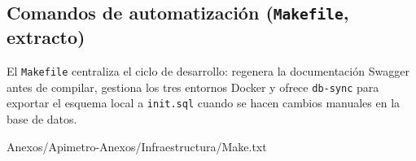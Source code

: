 \subsection*{Comandos de automatización (\texttt{Makefile}, extracto)}

El \texttt{Makefile} centraliza el ciclo de desarrollo: regenera la
documentación Swagger antes de compilar, gestiona los tres entornos Docker y
ofrece \texttt{db-sync} para exportar el esquema local a \texttt{init.sql}
cuando se hacen cambios manuales en la base de datos.

 {Anexos/Apimetro-Anexos/Infraestructura/Make.txt}
